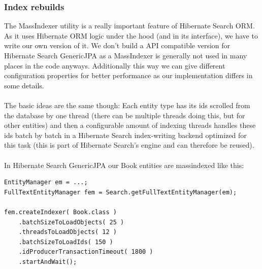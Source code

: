 \subsubsection{Index rebuilds}

The MassIndexer utility is a really important feature of Hibernate Search ORM. As it uses Hibernate ORM logic under the hood (and in its interface), we have to write our own version of it. We don't build a API compatible version for Hibernate Search GenericJPA as a MassIndexer is generally not used in many places in the code anyways. Additionally this way we can give different configuration properties for better performance as our implementation differs in some details.
\\\\
The basic ideas are the same though: Each entity type has its ids scrolled from the database by one thread (there can be multiple threads doing this, but for other entities) and then a configurable amount of indexing threads handles these ids batch by batch in a Hibernate Search index-writing backend optimized for this task (this is part of Hibernate Search's engine and can therefore be reused).
\\\\
In Hibernate Search GenericJPA our Book entities are massindexed like this:
\\
\lstset{language=java}
\begin{lstlisting}[frame=htrbl, caption={MassIndexer usage with Hibernate Search ORM}, label={lst:massindexing_hsearch_orm.java}]
EntityManager em = ...;
FullTextEntityManager fem = Search.getFullTextEntityManager(em);

fem.createIndexer( Book.class )
	.batchSizeToLoadObjects( 25 )
	.threadsToLoadObjects( 12 )
	.batchSizeToLoadIds( 150 )
	.idProducerTransactionTimeout( 1800 )
	.startAndWait();
\end{lstlisting}

\pagebreak